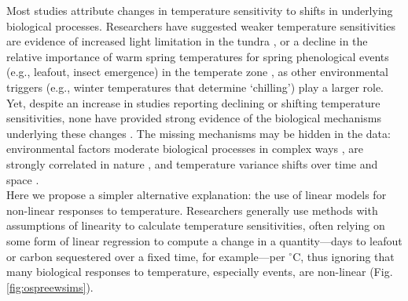 \documentclass[11pt,letter]{article}
\begin{document}
Most studies attribute changes in temperature sensitivity to shifts in underlying biological processes. Researchers have suggested weaker temperature sensitivities are evidence of increased light limitation in the tundra \citep{piao2017}, or a decline in the relative importance of warm spring temperatures for spring phenological events (e.g., leafout, insect emergence) in the temperate zone \citep{fu2015,meng2020}, as other environmental triggers (e.g., winter temperatures that determine `chilling') play a larger role. Yet, despite an increase in studies reporting declining or shifting temperature sensitivities, none have provided strong evidence of the biological mechanisms underlying these changes  \citep[e.g.,][]{fu2015,meng2020}. The missing mechanisms may be hidden in the data: environmental factors moderate biological processes in complex ways \citep{chuine2016}, are strongly correlated in nature \citep[e.g.,][]{fu2015}, and temperature variance shifts over time and space \citep{keenan2019}. \\

Here we propose a simpler alternative explanation: the use of linear models for non-linear responses to temperature. Researchers generally use methods with assumptions of linearity to calculate temperature sensitivities, often relying on some form of linear regression to compute a change in a quantity---days to leafout or carbon sequestered over a fixed time, for example---per $^{\circ}$C, thus ignoring that many biological responses to temperature, especially events, are non-linear (Fig. \ref{fig:ospreewsims}). \\ %
\end{document}
